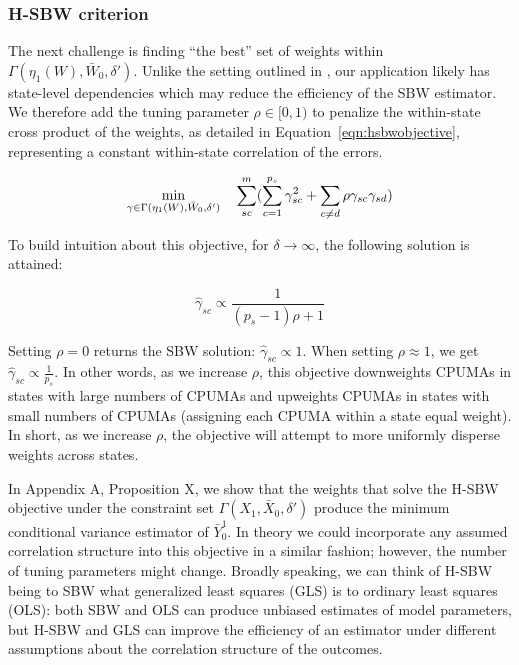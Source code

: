 \documentclass[aoas]{imsart}
\theoremstyle{plain}
\theoremstyle{remark}
\begin{document}
\subsubsection{H-SBW criterion}\label{sssec:hsbw}

The next challenge is finding ``the best'' set of weights within $\Gamma(\eta_1(W), \bar{W}_0, \delta')$. Unlike the setting outlined in \cite{zubizarreta2015stable}, our application likely has state-level dependencies which may reduce the efficiency of the SBW estimator. We therefore add the tuning parameter $\rho \in [0, 1)$ to penalize the within-state cross product of the weights, as detailed in Equation~\ref{eqn:hsbwobjective}, representing a constant within-state correlation of the errors.

\begin{equation}\label{eqn:hsbwobjective}
\min_{\gamma \in \Gamma(\eta_1(W), \bar{W}_0, \delta')} \quad \sum_{sc}^{m}(\sum_{c = 1}^{p_s}\gamma_{sc}^2 + \sum_{c \ne d}\rho \gamma_{sc}\gamma_{sd})\\
\end{equation}

To build intuition about this objective, for $\delta \to \infty$, the following solution is attained:

\begin{equation}\label{eqn:sbwsol}
\hat{\gamma}_{sc} \propto \frac{1}{(p_s - 1)\rho + 1}
\end{equation}

Setting $\rho = 0$ returns the SBW solution: $\hat{\gamma}_{sc} \propto 1$. When setting $\rho \approx 1$, we get $\hat{\gamma}_{sc} \propto \frac{1}{p_s}$. In other words, as we increase $\rho$, this objective downweights CPUMAs in states with large numbers of CPUMAs and upweights CPUMAs in states with small numbers of CPUMAs (assigning each CPUMA within a state equal weight). In short, as we increase $\rho$, the objective will attempt to more uniformly disperse weights across states. 

In Appendix A, Proposition X, we show that the weights that solve the H-SBW objective under the constraint set $\Gamma(X_1, \bar{X}_0, \delta')$ produce the minimum conditional variance estimator of $\bar{Y}_0^1$. In theory we could incorporate any assumed correlation structure into this objective in a similar fashion; however, the number of tuning parameters might change. Broadly speaking, we can think of H-SBW being to SBW what generalized least squares (GLS) is to ordinary least squares (OLS): both SBW and OLS can produce unbiased estimates of model parameters, but H-SBW and GLS can improve the efficiency of an estimator under different assumptions about the correlation structure of the outcomes. 
\end{document}
